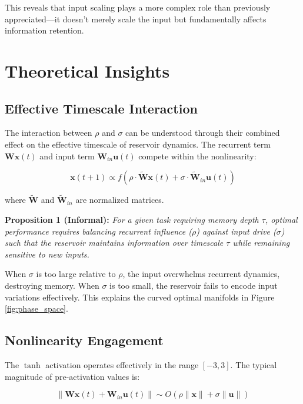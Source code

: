 \documentclass[11pt]{article}
\begin{document}
This reveals that input scaling plays a more complex role than previously appreciated—it doesn't merely scale the input but fundamentally affects information retention.

\section{Theoretical Insights}

\subsection{Effective Timescale Interaction}

The interaction between $\rho$ and $\sigma$ can be understood through their combined effect on the effective timescale of reservoir dynamics. The recurrent term $\mathbf{W}\mathbf{x}(t)$ and input term $\mathbf{W}_{in}\mathbf{u}(t)$ compete within the nonlinearity:

\begin{equation}
    \mathbf{x}(t+1) \propto f(\rho \cdot \mathbf{\tilde{W}}\mathbf{x}(t) + \sigma \cdot \mathbf{\tilde{W}}_{in}\mathbf{u}(t))
\end{equation}

where $\mathbf{\tilde{W}}$ and $\mathbf{\tilde{W}}_{in}$ are normalized matrices.

\textbf{Proposition 1 (Informal):} \emph{For a given task requiring memory depth $\tau$, optimal performance requires balancing recurrent influence ($\rho$) against input drive ($\sigma$) such that the reservoir maintains information over timescale $\tau$ while remaining sensitive to new inputs.}

When $\sigma$ is too large relative to $\rho$, the input overwhelms recurrent dynamics, destroying memory. When $\sigma$ is too small, the reservoir fails to encode input variations effectively. This explains the curved optimal manifolds in Figure \ref{fig:phase_space}.

\subsection{Nonlinearity Engagement}

The $\tanh$ activation operates effectively in the range $[-3, 3]$. The typical magnitude of pre-activation values is:

\begin{equation}
    \|\mathbf{W}\mathbf{x}(t) + \mathbf{W}_{in}\mathbf{u}(t)\| \sim O(\rho\|\mathbf{x}\| + \sigma\|\mathbf{u}\|)
\end{equation}
\end{document}
